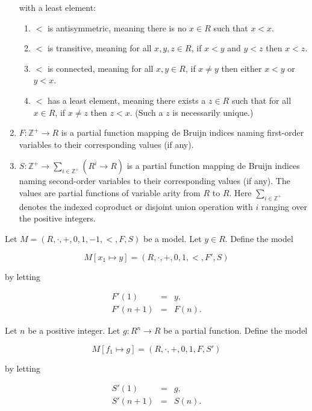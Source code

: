 \documentclass[11pt]{article}
\begin{document}
\begin{enumerate}
		with a least element:
		\begin{enumerate}
			\item $<$ is antisymmetric, meaning there is no $x \in R$ such that $x < x$.
			\item $<$ is transitive, meaning for all $x, y, z \in R$, if $x < y$ and $y < z$ then $x < z$.
			\item $<$ is connected, meaning for all $x, y \in R$, if $x \neq y$ then either $x < y$ or $y < x$.
			\item $<$ has a least element, meaning there exists a $z \in R$ such that for all $x \in R$, if $x \neq z$ then $z < x$. (Such a $z$ is necessarily unique.)
		\end{enumerate}
	\item $F : \mathbb{Z}^+ \to R$ is a partial function mapping de Bruijn indices
		naming first-order variables to their corresponding values (if any).
	\item $S : \mathbb{Z}^+ \to \sum_{i \in \mathbb{Z}^+} (R^i \to R)$ is a partial function
		mapping de Bruijn indices naming second-order variables to their
		corresponding values (if any). The values are partial functions of
		variable arity from $R$ to $R$. Here $\sum_{i \in \mathbb{Z}^+}$ denotes
		the indexed coproduct or disjoint union operation with $i$ ranging
		over the positive integers.
\end{enumerate}

Let $M = (R, \cdot, +, 0, 1, -1, <, F, S)$ be a model. Let $y \in R$.
Define the model

\begin{equation}
M[x_1 \mapsto y] = (R, \cdot, +, 0, 1, <, F', S)
\end{equation}

by letting

\begin{equation}
	\begin{array}{rcl}
		F'(1) &=& y,\\
		F'(n+1) &=& F(n).
	\end{array}
\end{equation}

Let $n$ be a positive integer. Let $g : R^n \to R$ be a partial function.
Define the model

\begin{equation}
	M[f_1 \mapsto g] = (R, \cdot, +, 0, 1, F, S')
\end{equation}

by letting

\begin{equation}
	\begin{array}{rcl}
		S'(1) &=& g, \\
		S'(n+1) &=& S(n).
	\end{array}
\end{equation}
\end{document}
